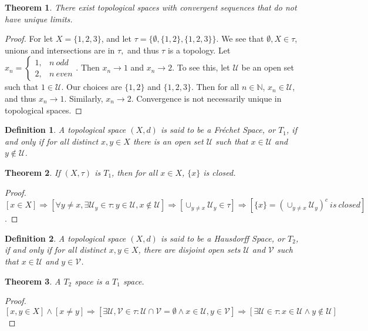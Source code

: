 \documentclass[crop=false,class=book]{standalone}
\theoremstyle{mystyle}
\newtheorem{theorem}{Theorem}[section]
\newtheorem{definition}{Definition}[section]
\begin{document}
\begin{theorem}
There exist topological spaces with convergent sequences that do not have unique limits.
\end{theorem}
\begin{proof}
For let $X = \{1,2,3\}$, and let $\tau = \{\emptyset, \{1,2\},\{1,2,3\}\}$. We see that $\emptyset,X\in \tau$, unions and intersections are in $\tau,$ and thus $\tau$ is a topology. Let $x_n = \begin{cases} 1, & n\ odd \\ 2, & n\ even\end{cases}$. Then $x_n \rightarrow 1$ and $x_n \rightarrow 2$. To see this, let $\mathcal{U}$ be an open set such that $1\in \mathcal{U}$. Our choices are $\{1,2\}$ and $\{1,2,3\}$. Then for all $n\in \mathbb{N}$, $x_n \in \mathcal{U}$, and thus $x_n \rightarrow 1$. Similarly, $x_n \rightarrow 2$. Convergence is not necessarily unique in topological spaces.
\end{proof}
\begin{definition}
A topological space $(X,d)$ is said to be a Fr\'{e}chet Space, or $T_1$, if and only if for all distinct $x,y\in X$ there is an open set $\mathcal{U}$ such that $x\in \mathcal{U}$ and $y\notin \mathcal{U}$.
\end{definition}
\begin{theorem}
If $(X,\tau)$ is $T_1$, then for all $x\in X$, $\{x\}$ is closed.
\end{theorem}
\begin{proof}
$[x\in X]\Rightarrow [\forall y\ne x, \exists \mathcal{U}_y\in \tau:y\in \mathcal{U},x\notin\mathcal{U}]\Rightarrow [\cup_{y\ne x}\mathcal{U}_y\in \tau]\Rightarrow [\{x\}=(\cup_{y\ne x}\mathcal{U}_y)^c\ is\ closed]$.
\end{proof}
\begin{definition}
A topological space $(X,d)$ is said to be a Hausdorff Space, or $T_2$, if and only if for all distinct $x,y\in X$, there are disjoint open sets $\mathcal{U}$ and $\mathcal{V}$ such that $x\in \mathcal{U}$ and $y\in \mathcal{V}$.
\end{definition}
\begin{theorem}
A $T_2$ space is a $T_1$ space.
\end{theorem}
\begin{proof}
$[x,y\in X]\land [x\ne y]\Rightarrow [\exists \mathcal{U},\mathcal{V}\in \tau:\mathcal{U}\cap \mathcal{V}=\emptyset\land x\in \mathcal{U},y\in \mathcal{V}]\Rightarrow [\exists \mathcal{U}\in \tau:x\in \mathcal{U}\land y\notin \mathcal{U}]$
\end{proof}
\end{document}
